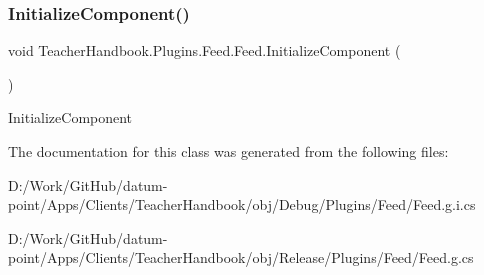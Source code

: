 \subsubsection{\texorpdfstring{Initialize\+Component()}{InitializeComponent()}\hspace{0.1cm}{\footnotesize\ttfamily [5/5]}}
{\footnotesize\ttfamily void Teacher\+Handbook.\+Plugins.\+Feed.\+Feed.\+Initialize\+Component (\begin{DoxyParamCaption}{ }\end{DoxyParamCaption})}



Initialize\+Component 



The documentation for this class was generated from the following files\+:\begin{DoxyCompactItemize}
\item 
D\+:/\+Work/\+Git\+Hub/datum-\/point/\+Apps/\+Clients/\+Teacher\+Handbook/obj/\+Debug/\+Plugins/\+Feed/Feed.\+g.\+i.\+cs\item 
D\+:/\+Work/\+Git\+Hub/datum-\/point/\+Apps/\+Clients/\+Teacher\+Handbook/obj/\+Release/\+Plugins/\+Feed/Feed.\+g.\+cs\end{DoxyCompactItemize}
